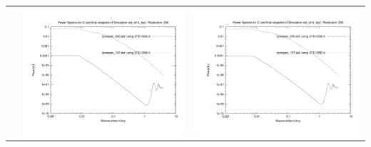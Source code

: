 \documentclass[a4paper,11pt,fleqn,oneside]{book}
\begin{document}
\begin{itemize}
\begin{table}[p]
\begin{tabular}{l|c|c}
 & \includegraphics[scale=0.25]{r256/h70/red_st14_log1/plot_powspec_red_st14_log1.pdf} & \includegraphics[scale=0.25]{r256/h100/red_st14_log1/plot_powspec_red_st14_log1.pdf} \\

\end{tabular}
\end{table}
\end{itemize}
\end{document}
